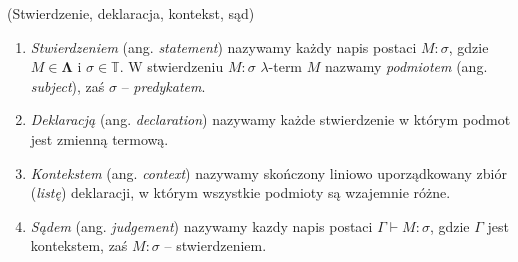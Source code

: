 
\begin{definicja}(Stwierdzenie, deklaracja, kontekst, sąd)\label{def:statement_simple}
  \begin{enumerate}[label=(\arabic*)]
  \setlength\itemsep{0em}
  \item \emph{Stwierdzeniem} (ang. \emph{statement}) nazywamy każdy napis postaci \(M:\sigma\), gdzie \(M\in\mathbf{\Lambda}\) i \(\sigma\in\mathbb{T}\). W stwierdzeniu \(M:\sigma\) \(\lambda\)-term \(M\) nazwamy \emph{podmiotem} (ang. \emph{subject}), zaś \(\sigma\) -- \emph{predykatem}.
  \item \emph{Deklaracją} (ang. \emph{declaration}) nazywamy każde stwierdzenie w którym podmot jest zmienną termową.
  \item \emph{Kontekstem} (ang. \emph{context}) nazywamy skończony liniowo uporządkowany zbiór (\emph{listę}) deklaracji, w którym wszystkie podmioty są wzajemnie różne.
  \item \emph{Sądem} (ang. \emph{judgement}) nazywamy kazdy napis postaci \(\Gamma\vdash M:\sigma\), gdzie \(\Gamma\) jest kontekstem, zaś \(M:\sigma\) -- stwierdzeniem.  
  \end{enumerate}
\end{definicja}

